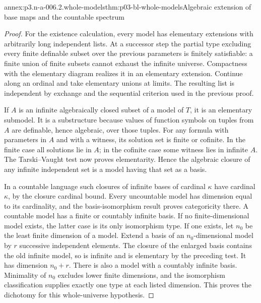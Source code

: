 \begin{annexitem}{annex:p3.n-a-006.2.whole-models}{thm:p03-bl-whole-models}{Algebraic extension of base maps and the countable spectrum}
\begin{proof}
For the existence calculation, every model has elementary extensions
with arbitrarily long independent lists. At a successor step the
partial type excluding every finite definable subset over the
previous parameters is finitely satisfiable: a finite union of
finite subsets cannot exhaust the infinite universe. Compactness
with the elementary diagram realizes it in an elementary extension.
Continue along an ordinal and take elementary unions at limits.
The resulting list is independent by exchange and the sequential
criterion used in the previous proof.

If \(A\) is an infinite algebraically closed subset of a model of
\(T\), it is an elementary submodel. It is a substructure because
values of function symbols on tuples from \(A\) are definable, hence
algebraic, over those tuples. For any formula with parameters in
\(A\) and with a witness, its solution set is finite or cofinite.
In the finite case all solutions lie in \(A\); in the cofinite
case some witness lies in infinite \(A\). The Tarski--Vaught test
now proves elementarity. Hence the algebraic closure of any infinite
independent set is a model having that set as a basis.

In a countable language such closures of infinite bases of cardinal
\(\kappa\) have cardinal \(\kappa\), by the closure cardinal bound.
Every uncountable model has dimension equal to its cardinality,
and the basis-isomorphism result proves categoricity there. A
countable model has a finite or countably infinite basis. If no
finite-dimensional model exists, the latter case is its only
isomorphism type. If one exists, let \(n_0\) be the least finite
dimension of a model. Extend a basis of an \(n_0\)-dimensional
model by \(r\) successive independent elements. The closure of the
enlarged basis contains the old infinite model, so is infinite and
is elementary by the preceding test. It has dimension \(n_0+r\).
There is also a model with a countably infinite basis. Minimality
of \(n_0\) excludes lower finite dimensions, and the isomorphism
classification supplies exactly one type at each listed dimension.
This proves the dichotomy for this whole-universe hypothesis.
\end{proof}
\end{annexitem}

